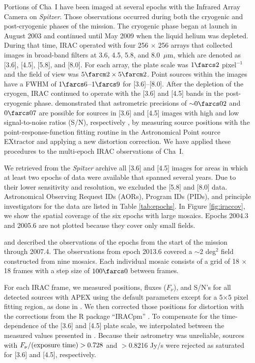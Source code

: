 \documentclass{emulateapj}
\begin{document}
Portions of Cha~I have been imaged at several epochs with 
the Infrared Array Camera \citep[IRAC;][]{faz04} on {\it Spitzer}.
Those observations occurred during both the cryogenic and post-cryogenic phases of the mission. 
The cryogenic phase began at launch in August 2003 and continued until 
May 2009 when the liquid helium was depleted. During that time, 
IRAC operated with four 256 $\times$ 256 arrays that collected images in 
broad-band filters at 3.6, 4.5, 5.8, and 8.0~$\mu$m, 
which are denoted as [3.6], [4.5], [5.8], and [8.0]. For each array,
the plate scale was $1\farcs2$ pixel$^{-1}$ and the field of view was $5\farcm2 \times 5\farcm2$.
Point sources within the images have a FWHM of $1\farcs6$--$1\farcs9$
for [3.6]--[8.0]. After the depletion of the cryogen, 
IRAC continued to operate with the [3.6] and [4.5] bands in the post-cryogenic phase. 
\cite{esp16} demonstrated that astrometric precisions
of $\sim$$0\farcs02$ and $0\farcs07$ are possible
for sources in [3.6] and [4.5] images with high and low signal-to-noise ratios (S/N), respectively
\citep[see also][]{dup13,low14}, by measuring source positions with the point-response-function 
fitting routine in the Astronomical Point source EXtractor \citep[APEX;][]{mak05} 
and applying a new distortion correction. 
We have applied these procedures to the multi-epoch IRAC observations of Cha~I.

We retrieved from the {\it Spitzer} archive all [3.6] and [4.5] images
for areas in which at least two epochs of data were available that spanned
several years. Due to their lower sensitivity and resolution, 
we excluded the [5.8] and [8.0] data. 
Astronomical Observing Request IDs (AORs), Program IDs (PIDs), and principle 
investigators for the data are listed in Table \ref{tab:epochs}.
In Figure \ref{fig:iraccov}, we show the spatial coverage of the six 
epochs with large mosaics. 
Epochs 2004.3 and 2005.6 are not plotted because they cover only small fields. 

\cite{luh08} and \cite{luhM08} described the observations of the 
epochs from the start of the mission through 2007.4. The observations from
epoch 2013.6 covered a $\sim$2 deg$^2$ field constructed from nine mosaics.
Each individual mosaic consists of a grid of 18 $\times$ 18 frames 
with a step size of $100\farcs0$ between frames.

For each IRAC frame, we measured positions, fluxes ($F_\nu$), and
S/N's for all detected sources with APEX using the default parameters
except for a 5$\times$5 pixel fitting region, as done in \cite{esp16}.
We then corrected those positions for distortion with the corrections
from the R package ``IRACpm'' \citep{rrr,esp16}.
To compensate for the time-dependence of the [3.6] and [4.5] plate scale,
we interpolated between the measured values presented in \cite{esp16}.
Because their astrometry was unreliable,
sources with $F_\nu / ({\rm exposure\ time}) > 0.728$ and $>$0.8216 Jy/s 
were rejected as saturated for [3.6] and [4.5], respectively. 
\end{document}
